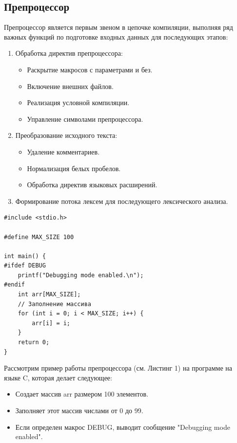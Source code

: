\subsection{Препроцессор}
Препроцессор является первым звеном в цепочке компиляции, выполняя ряд важных функций по подготовке входных данных для последующих этапов:
\begin{enumerate}
    \item Обработка директив препроцессора:
    \begin{itemize}[label = ---]
        \item Раскрытие макросов с параметрами и без.
        \item Включение внешних файлов.
        \item Реализация условной компиляции.
        \item Управление символами препроцессора.
    \end{itemize}
    \item Преобразование исходного текста:
    \begin{itemize}[label =---]
        \item Удаление комментариев.
        \item Нормализация белых пробелов.
        \item Обработка директив языковых расширений.
    \end{itemize}
    \item Формирование потока лексем для последующего лексического анализа.
\end{enumerate}

\begin{lstlisting}[label=1,caption=До препроцессинга]
#include <stdio.h>

#define MAX_SIZE 100

int main() {
#ifdef DEBUG
    printf("Debugging mode enabled.\n");
#endif
    int arr[MAX_SIZE];
    // Заполнение массива
    for (int i = 0; i < MAX_SIZE; i++) {
        arr[i] = i;
    }
    return 0;
}
\end{lstlisting}

Рассмотрим пример работы препроцессора (см. Листинг 1) на программе на языке C, которая делает следующее:
\begin{itemize}[label = ---]
    \item Создает массив arr размером 100 элементов.
    \item Заполняет этот массив числами от 0 до 99.
    \item Если определен макрос DEBUG, выводит сообщение "Debugging mode enabled".
\end{itemize}

